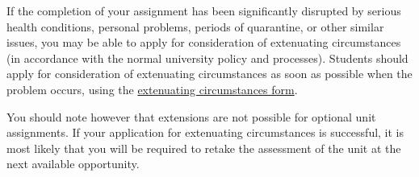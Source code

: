 \documentclass{article}
\begin{document}
If the completion of your assignment has been significantly disrupted by
serious health conditions, personal problems, periods of quarantine, or
other similar issues, you may be able to apply for consideration of
extenuating circumstances (in accordance with the normal university
policy and processes). Students should apply for consideration of
extenuating circumstances as soon as possible when the problem occurs,
using the \href{https://www.bristol.ac.uk/request-extenuating-circumstances-form}{extenuating circumstances form}.

You should note however that extensions are not possible for optional
unit assignments. If your application for extenuating circumstances is
successful, it is most likely that you will be required to retake the
assessment of the unit at the next available opportunity.
\end{document}
